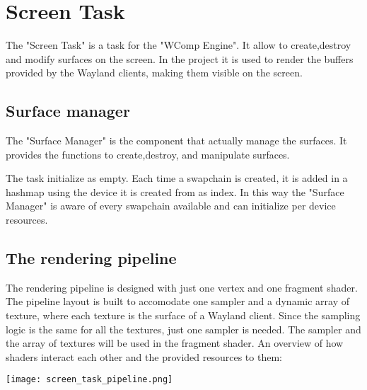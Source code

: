 \chapter{Screen Task}
The "Screen Task" is a task for the "WComp Engine". It allow to create,destroy and modify surfaces on the screen. In the project it is used to render the buffers provided by the Wayland clients, making them visible on the screen.

\section{Surface manager}
The "Surface Manager" is the component that actually manage the surfaces. It provides the functions to create,destroy, and manipulate surfaces.



The task initialize as empty. Each time a swapchain is created, it is added in a hashmap using the device it is created from as index. In this way the "Surface Manager" is aware of every swapchain available and can initialize per device resources.


\section{The rendering pipeline}
The rendering pipeline is designed with just one vertex and one fragment shader.
The pipeline layout is built to accomodate one sampler and a dynamic array of texture, where each texture is the surface of a Wayland client. Since the sampling logic is the same for all the textures, just one sampler is needed.
The sampler and the array of textures will be used in the fragment shader.
An overview of how shaders interact each other and the provided resources to them:
\begin{center}
	\texttt{[image: screen\_task\_pipeline.png]}
\end{center}


